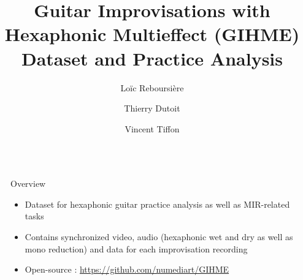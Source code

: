 \documentclass[final]{beamer}
\title{Guitar Improvisations with Hexaphonic Multieffect (GIHME) Dataset and Practice Analysis} %
\author{Loïc Reboursière%
\and
Thierry Dutoit%
\and
Vincent Tiffon}
\newlength{\sepwid}
\newlength{\onecolwid}
\begin{document}

\setlength{\belowcaptionskip}{2ex} %
\setlength\belowdisplayshortskip{2ex} %

\begin{frame}[t] %

\begin{columns}[t] %

\begin{column}{\sepwid}\end{column} %

\begin{column}{\onecolwid} %


\begin{alertblock}{Overview}



\begin{itemize}
    \item Dataset for hexaphonic guitar practice analysis as well as MIR-related tasks
    \item Contains synchronized video, audio (hexaphonic wet and dry as well as mono reduction) and data for each improvisation recording
    \item Open-source : \url{https://github.com/numediart/GIHME}
    

\end{itemize}
\end{alertblock}
\end{column}
\end{columns}
\end{frame}
\end{document}
